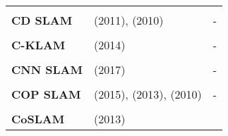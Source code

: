 \documentclass[a4paper,12pt]{scrartcl}
\begin{document}
{\begin{longtable}{l|l|l}
                                                                                                                                  &                                                                                            &   \\ [-3mm]
    \textbf{CD SLAM}                                                                                                              & \cite{Pirker2011} (2011), \cite{Pirker2010} (2010)                                         & - \\
                                                                                                                                  &                                                                                            &   \\ [-3mm]
    \textbf{C-KLAM}                                                                                                               & \cite{Nerurkar2014} (2014)                                                                 & - \\
                                                                                                                                  &                                                                                            &   \\ [-3mm]
    \textbf{CNN SLAM}                                                                                                             & \cite{Tateno2017} (2017)                                                                   & - \\
                                                                                                                                  &                                                                                            &   \\ [-3mm]
    \textbf{COP SLAM}                                                                                                             & \cite{Dubbelman2015} (2015), \cite{Dubbelman2013} (2013), \cite{Dubbelman2010} (2010)      & - \\
                                                                                                                                  &                                                                                            &   \\ [-3mm]
    \textbf{CoSLAM}                                                                                                               & \cite{Zou2013} (2013)

\end{longtable}}
\end{document}
